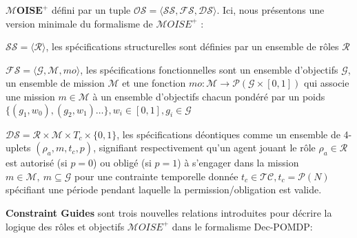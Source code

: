 \documentclass[sigconf,anonymous]{aamas}
\begin{document}
$\mathbf{\mathcal{M}OISE^+}$ \quad défini par un tuple $\mathcal{OS} = \langle \mathcal{SS}, \mathcal{FS}, \mathcal{DS} \rangle$. Ici, nous présentons une version minimale du formalisme de $\mathcal{M}OISE^+$ :
\begin{itemize*}[label={},itemjoin={; }]
    \item $\mathcal{SS} = \langle \mathcal{R} \rangle$, les spécifications structurelles sont définies par un ensemble de rôles $\mathcal{R}$
    \item $\mathcal{FS} = \langle \mathcal{G}, \mathcal{M}, mo \rangle$, les spécifications fonctionnelles sont un ensemble d'objectifs $\mathcal{G}$, un ensemble de mission $\mathcal{M}$ et une fonction $mo: \mathcal{M} \to \mathcal{P}(\mathcal{G} \times [0,1])$ qui associe une mission $m \in \mathcal{M}$ à un ensemble d'objectifs chacun pondéré par un poids $\{(g_1,w_0), (g_2,w_1)\dots\}, w_i \in [0,1], g_i \in \mathcal{G}$
    \item $\mathcal{DS} = \mathcal{R} \times \mathcal{M} \times T_c \times \{0,1\}$, les spécifications déontiques comme un ensemble de 4-uplets $(\rho_a, m, \allowbreak t_c, p)$, signifiant respectivement qu'un agent jouant le rôle $\rho_a \in \mathcal{R}$ est autorisé (si $p = 0$) ou obligé (si $p = 1$) à s'engager dans la mission $m \in \mathcal{M}, \ m \subseteq \mathcal{G}$ pour une contrainte temporelle donnée $t_c \in \mathcal{TC}, t_c = \mathcal{P}(N)$ spécifiant une période pendant laquelle la permission/obligation est valide.
\end{itemize*}

\textbf{Constraint Guides} \quad sont trois nouvelles relations introduites pour décrire la logique des rôles et objectifs $\mathcal{M}OISE^+$ dans le formalisme Dec-POMDP:
\end{document}
